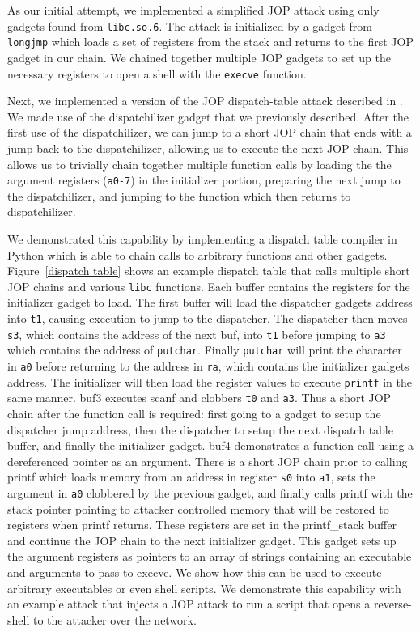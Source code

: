 As our initial attempt, we implemented a simplified JOP attack using only
gadgets found from \verb|libc.so.6|. The attack is initialized by a gadget from
\verb|longjmp| which loads a set of registers from the stack and returns to the
first JOP gadget in our chain. We chained together multiple JOP gadgets to set
up the necessary registers to open a shell with the \verb|execve| function.

Next, we implemented a version of the JOP dispatch-table attack described in
\cite{bletsch11jopx86}. We made use of the dispatchilizer gadget that we
previously described. After the first use of the dispatchilizer, we can jump to
a short JOP chain that ends with a jump back to the dispatchilizer, allowing us
to execute the next JOP chain. This allows us to trivially chain together
multiple function calls by loading the the argument registers (\verb|a0-7|) in
the initializer portion, preparing the next jump to the dispatchilizer, and
jumping to the function which then returns to dispatchilizer. 

We demonstrated this capability by implementing a dispatch table compiler in
Python which is able to chain calls to arbitrary functions and other gadgets.
Figure~\ref{dispatch table} shows an example dispatch table that calls multiple
short JOP chains and various \verb|libc| functions. Each buffer contains the
registers for the initializer gadget to load. The first buffer will load
the dispatcher gadgets address into \verb|t1|, causing execution to jump to
the dispatcher. The dispatcher then moves \verb|s3|, which contains the address
of the next buf, into \verb|t1| before jumping to \verb|a3| which contains
the address of \verb|putchar|. Finally \verb|putchar| will print the character
in \verb|a0| before returning to the address in \verb|ra|, which contains the
initializer gadgets address. The initializer will then load the register values
to execute \verb|printf| in the same manner. buf3 executes scanf and clobbers
\verb|t0| and \verb|a3|. Thus a short JOP chain after the function call is
required: first going to a gadget to setup the dispatcher jump address,
then the dispatcher to setup the next dispatch table buffer, and finally the
initializer gadget. buf4 demonstrates a function call using a dereferenced
pointer as an argument. There is a short JOP chain prior to calling
printf which loads memory from an address in register \verb|s0| into \verb|a1|,
sets the argument in \verb|a0| clobbered by the previous gadget, and finally
calls printf with the stack pointer pointing to attacker controlled memory
that will be restored to registers when printf returns. These registers
are set in the printf\_stack buffer and continue the JOP chain to the next
initializer gadget. This gadget sets up the argument registers as pointers
to an array of strings containing an executable and arguments to pass to
execve. We show how this can be used to execute arbitrary executables
or even shell scripts. We demonstrate this capability with an example attack
that injects a JOP attack to run a script that opens a reverse-shell to the
attacker over the network.

